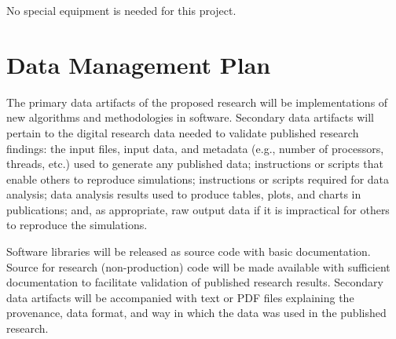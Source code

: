 \documentclass[11pt]{article}
\begin{document}
No special equipment is needed for this project.

\newpage
\section{Data Management Plan}


The primary data artifacts of the proposed research will be implementations of
new algorithms and methodologies in software. Secondary data artifacts will
pertain to the digital research data needed to validate published research
findings: the input files, input data, and metadata (e.g., number of processors,
threads, etc.) used to generate any published data; instructions or scripts that
enable others to reproduce simulations; instructions or scripts required for
data analysis; data analysis results used to produce tables, plots, and charts
in publications; and, as appropriate, raw output data if it is impractical for
others to reproduce the simulations.

\medskip

Software libraries will be released as source code with basic documentation.
Source for research (non-production) code will be made available with sufficient
documentation to facilitate validation of published research results. Secondary
data artifacts will be accompanied with text or PDF files explaining the
provenance, data format, and way in which the data was used in the published
research.

\medskip
\end{document}
